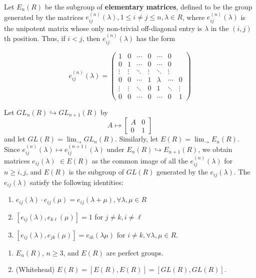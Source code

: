 Let $E_n(R)$ be the subgroup of \textbf{elementary matrices}, defined to be the group generated by the matrices $e_{i j}^{(n)}(\lambda), 1 \leq i \neq j \leq n, \lambda \in R$, where $e_{i j}^{(n)}(\lambda)$ is the unipotent matrix whose only non-trivial off-diagonal entry is $\lambda$ in the $(i, j)$ th position. Thus, if $i<j$, then $e_{i j}^{(n)}(\lambda)$ has the form 

\[
e_{ij}^{(n)}(\lambda) =
\begin{pmatrix}
1 & 0 & \cdots & 0 & \cdots & 0 \\
0 & 1 & \cdots & 0 & \cdots & 0 \\
\vdots & \vdots & \ddots & \vdots & \ddots & \vdots \\
0 & 0 & \cdots & 1 & \lambda & \cdots & 0 \\
\vdots & \vdots & \ddots & 0 & 1 & \ddots & \vdots \\
0 & 0 & \cdots & 0 & \cdots & 0 & 1
\end{pmatrix}
\]

Let $G L_n(R) \hookrightarrow G L_{n+1}(R)$ by
$$
A \longmapsto\left[\begin{array}{ll}
A & 0 \\
0 & 1
\end{array}\right]
$$
and let $G L(R)=\lim _{\rightarrow} G L_n(R)$. Similarly, let $E(R)=\lim _{\rightarrow} E_n(R)$. Since $e_{i j}^{(n)}(\lambda) \longmapsto e_{i j}^{(n+1)}(\lambda)$ under $E_n(R) \hookrightarrow E_{n+1}(R)$, we obtain matrices $e_{i j}(\lambda)$ $\in E(R)$ as the common image of all the $e_{i j}^{(n)}(\lambda)$ for $n \geq i, j$, and $E(R)$ is the subgroup of $G L(R)$ generated by the $e_{i j}(\lambda)$. The $e_{i j}(\lambda)$ satisfy the following identities:

\begin{enumerate}
    \item $e_{i j}(\lambda) \cdot e_{i j}(\mu)=e_{i j}(\lambda+\mu), \forall \lambda, \mu \in R$
    \item $\left[e_{i j}(\lambda), e_{k \ell}(\mu)\right]=1$ for $j \neq k, i \neq \ell$
    \item $\left[e_{i j}(\lambda), e_{j k}(\mu)\right]=e_{i k}(\lambda \mu)$ for $i \neq k, \forall \lambda, \mu \in R$.
\end{enumerate}

\begin{lemm}
    \begin{enumerate}
        \item $E_n(R)$, $n \geq 3$, and $E(R)$ are perfect groups.
        \item (Whitehead) $E(R)=[E(R), E(R)]=[G L(R), G L(R)]$.
    \end{enumerate}
\end{lemm}



